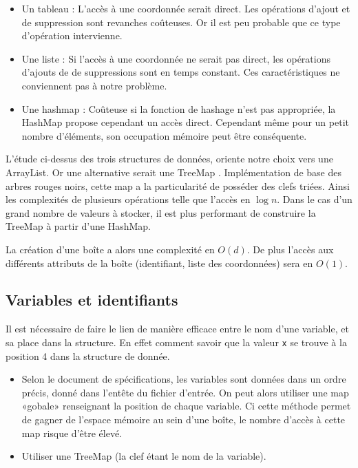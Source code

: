 \begin{itemize}
 \item
Un tableau : L'accès à une coordonnée serait direct. Les opérations d'ajout et de suppression sont revanches coûteuses. Or il est peu probable que ce type d'opération intervienne. 
\item
Une liste : Si l'accès à une coordonnée ne serait pas direct, les opérations d'ajouts de de suppressions sont en temps constant. Ces caractéristiques ne conviennent pas à notre problème.
\item
Une hashmap : Coûteuse si la fonction de hashage n'est pas appropriée, la HashMap propose cependant un accès direct. Cependant même pour un petit nombre d'éléments, son occupation mémoire peut être conséquente. 
\end{itemize}
L'étude ci-dessus des trois structures de données, oriente notre choix vers une ArrayList. Or une alternative serait une TreeMap \cite{TreeMap}. 
Implémentation de base des arbres rouges noirs, cette map a la particularité de posséder des clefs triées. Ainsi les complexités de plusieurs opérations telle que l'accès en $\log{n}$. Dans le cas d'un grand nombre de valeurs à stocker, il est plus performant de construire la TreeMap à partir d'une HashMap.

La création d'une boîte a alors une complexité en $O(d)$. De plus l'accès aux différents attributs de la boîte (identifiant, liste des coordonnées) sera en $O(1)$.

\subsection{Variables et identifiants}
Il est nécessaire de faire le lien de manière efficace entre le nom d'une variable, et sa place dans la structure. En effet comment savoir que la valeur \verb+x+ se trouve à la position 4 dans la structure de donnée.
\begin{itemize}
\item
Selon le document de spécifications, les variables sont données dans un ordre précis, donné dans l'entête du fichier d'entrée. On peut alors utiliser une map «gobale» renseignant la position de chaque variable. Ci cette méthode permet de gagner de l'espace mémoire au sein d'une boîte, le nombre d'accès à cette map risque d'être élevé.
\item
Utiliser une TreeMap (la clef étant le nom de la variable).
\end{itemize} 


